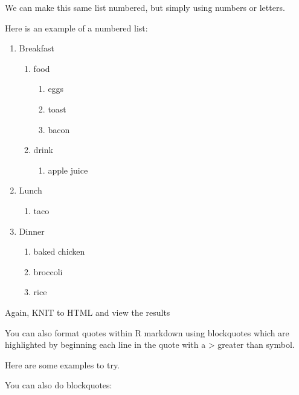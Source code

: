 \documentclass[]{book}
\providecommand{\tightlist}{%
  \setlength{\itemsep}{0pt}\setlength{\parskip}{0pt}}
\theoremstyle{definition}
\theoremstyle{definition}
\theoremstyle{definition}
\theoremstyle{remark}
\begin{document}
We can make this same list numbered, but simply using numbers or
letters.

Here is an example of a numbered list:

\begin{enumerate}
\def\labelenumi{\arabic{enumi}.}
\tightlist
\item
  Breakfast

  \begin{enumerate}
  \def\labelenumii{\alph{enumii}.}
  \tightlist
  \item
    food

    \begin{enumerate}
    \def\labelenumiii{\roman{enumiii}.}
    \tightlist
    \item
      eggs
    \item
      toast
    \item
      bacon
    \end{enumerate}
  \item
    drink

    \begin{enumerate}
    \def\labelenumiii{\roman{enumiii}.}
    \tightlist
    \item
      apple juice
    \end{enumerate}
  \end{enumerate}
\item
  Lunch

  \begin{enumerate}
  \def\labelenumii{\alph{enumii}.}
  \tightlist
  \item
    taco
  \end{enumerate}
\item
  Dinner

  \begin{enumerate}
  \def\labelenumii{\alph{enumii}.}
  \tightlist
  \item
    baked chicken
  \item
    broccoli
  \item
    rice
  \end{enumerate}
\end{enumerate}

Again, KNIT to HTML and view the results

You can also format quotes within R markdown using blockquotes which are
highlighted by beginning each line in the quote with a \textgreater{}
greater than symbol.

Here are some examples to try.

You can also do blockquotes:
\end{document}
